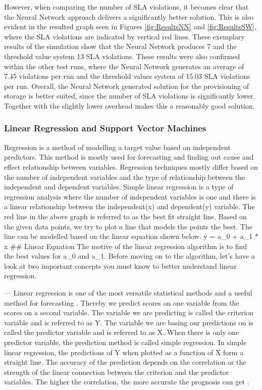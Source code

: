 However, when comparing the number of SLA violations, it becomes clear that the Neural Network approach delivers a significantly better solution. This is also evident in the resulted graph seen in Figures \ref{fig:ResultsNN} and \ref{fig:ResultsSW}, where the SLA violations are indicated by vertical red lines. These exemplary results of the simulation show that the Neural Network produces 7 and the threshold value system 13 SLA violations. These results were also confirmed within the other test runs, where the Neural Network generates an average of 7.45 violations per run and the threshold values system of 15.03 SLA violations per run. Overall, the Neural Network generated solution for the provisioning of storage is better suited, since the number of SLA violations is significantly lower. Together with the slightly lower overhead makes this a reasonably good solution.



\subsubsection{Linear Regression and Support Vector Machines}\label{SVM}

Regression is a method of modelling a target value based on independent predictors. This method is mostly used for forecasting and finding out cause and effect relationship between variables. Regression techniques mostly differ based on the number of independent variables and the type of relationship between the independent and dependent variables.
Simple linear regression is a type of regression analysis where the number of independent variables is one and there is a linear relationship between the independent(x) and dependent(y) variable. The red line in the above graph is referred to as the best fit straight line. Based on the given data points, we try to plot a line that models the points the best. The line can be modelled based on the linear equation shown below.
y = a_0 + a_1 * x      ## Linear Equation
The motive of the linear regression algorithm is to find the best values for a_0 and a_1. Before moving on to the algorithm, let’s have a look at two important concepts you must know to better understand linear regression.


---
Linear regression is one of the most versatile statistical methods and a useful method for forecasting \cite{weisberg2014applied}. Thereby we predict scores on one variable from the scores on a second variable. The variable we are predicting is called the criterion variable and is referred to as Y. The variable we are basing our predictions on is called the predictor variable and is referred to as X. When there is only one predictor variable, the prediction method is called simple regression. In simple linear regression, the predictions of Y when plotted as a function of X form a straight line. The accuracy of the prediction depends on the correlation or the strength of the linear connection between the criterion and the predictor variables. The higher the correlation, the more accurate the prognosis can get \cite{montgomery2013introduction}.



